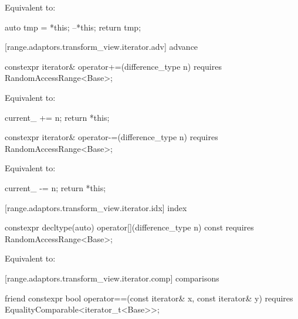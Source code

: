 {\begin{itemdescr}
\pnum
\effects Equivalent to:
\begin{codeblock}
auto tmp = *this;
--*this;
return tmp;
\end{codeblock}
\end{itemdescr}

[range.adaptors.transform_view.iterator.adv]{ advance}

\begin{itemdecl}
constexpr iterator& operator+=(difference_type n)
  requires RandomAccessRange<Base>;
\end{itemdecl}

\begin{itemdescr}
\pnum
\effects Equivalent to:
\begin{codeblock}
current_ += n;
return *this;
\end{codeblock}
\end{itemdescr}

%
\begin{itemdecl}
constexpr iterator& operator-=(difference_type n)
  requires RandomAccessRange<Base>;
\end{itemdecl}

\begin{itemdescr}
\pnum
\effects Equivalent to:
\begin{codeblock}
current_ -= n;
return *this;
\end{codeblock}
\end{itemdescr}

[range.adaptors.transform_view.iterator.idx]{ index}

\begin{itemdecl}
constexpr decltype(auto) operator[](difference_type n) const
  requires RandomAccessRange<Base>;
\end{itemdecl}

\begin{itemdescr}
\pnum
\effects Equivalent to: 
\end{itemdescr}

[range.adaptors.transform_view.iterator.comp]{ comparisons}

\begin{itemdecl}
friend constexpr bool operator==(const iterator& x, const iterator& y)
  requires EqualityComparable<iterator_t<Base>>;
\end{itemdecl}

}
